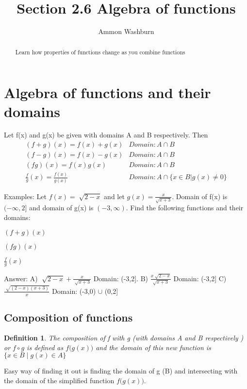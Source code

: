 \documentclass{tufte-handout}
\title{Section 2.6 Algebra of functions}
\author[AW]{Ammon Washburn}
\newtheorem{mydef}{Definition}
\begin{document}
\maketitle

\begin{abstract}
Learn how properties of functions change as you combine functions
\end{abstract}

\section{Algebra of functions and their domains}
Let f(x) and g(x) be given with domains A and B respectively.  Then
\begin{eqnarray}
(f + g)(x) = f(x) + g(x) & Domain: A \cap B \\
(f - g)(x) = f(x) - g(x) & Domain: A \cap B \\
(fg)(x) = f(x)g(x) & Domain: A \cap B \\
\frac{f}{g}(x) = \frac{f(x)}{g(x)} & Domain: A \cap \{x \in B | g(x) \neq 0 \}
\end{eqnarray}

Examples: Let $f(x) = \sqrt[]{2-x}$ and let $g(x) = \frac{x}{\sqrt{x+3}}$.  Domain of f(x) is $(-\infty,2]$ and domain of g(x) is 
$(-3,\infty)$.  Find the following functions and their domains:

\begin{enumerate*}[label=\Alph*]
\item $(f+g)(x)$
\item $(fg)(x)$
\item $\frac{f}{g}(x)$
\end{enumerate*}

\noindent Answer: A) $\sqrt[]{2-x} + \frac{x}{\sqrt[]{x+3}}$ Domain: (-3,2].  B) $\frac{x \sqrt[]{2-x}}{\sqrt{x+3}}$ Domain: (-3,2]  C) $\frac{\sqrt[]{(2-x)(x+3)}}{x}$ Domain: (-3,0) $\cup$ (0,2]

\subsection{Composition of functions}
\begin{mydef}
The composition of f with g (with domains A and B respectively ) or $f \circ g$ is defined as $f \big ( g(x) \big )$ and the domain of this new function is$ \{ x \in B \mid g(x) \in A \}$
\end{mydef}

Easy way of finding it out is finding the domain of g (B) and intersecting with the domain of the simplified function $f \big ( g(x) \big )$.
\end{document}
